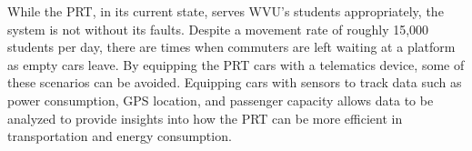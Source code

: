 While the PRT, in its current state, serves WVU’s students appropriately, the system is not without its faults. Despite a movement rate of roughly 15,000 students per day, there are times when commuters are left waiting at a platform as empty cars leave. By equipping the PRT cars with a telematics device, some of these scenarios can be avoided. Equipping cars with sensors to track data such as power consumption, GPS location, and passenger capacity allows data to be analyzed to provide insights into how the PRT can be more efficient in transportation and energy consumption.